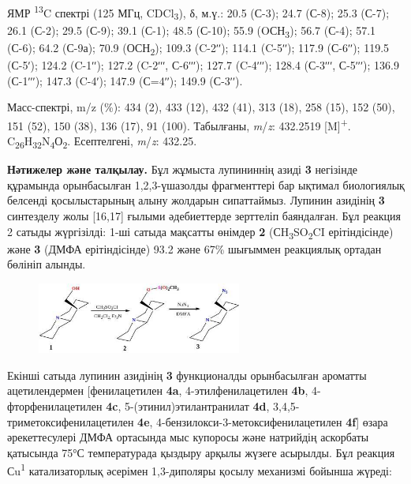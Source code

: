 \begin{multicols}{2}
ЯМР \textsuperscript{13}C спектрі (125 МГц, CDCl\textsubscript{3}), δ,
м.ү.: 20.5 (С-3); 24.7 (С-8); 25.3 (С-7); 26.1 (С-2); 29.5 (С-9); 39.1
(С-1); 48.5 (С-10); 55.9 (OСН\textsubscript{3}); 56.7 (С-4); 57.1 (С-6);
64.2 (С-9а); 70.9 (ОСН\textsubscript{2}); 109.3 (C-2ʹʹ); 114.1 (C-5ʹʹ);
117.9 (С-6ʹʹ); 119.5 (С-5ʹ); 124.2 (C-1ʹʹ); 127.2 (C-2ʹʹʹ, С-6ʹʹʹ);
127.7 (C-4ʹʹʹ); 128.4 (С-3ʹʹʹ, С-5ʹʹʹ); 136.9 (С-1ʹʹʹ); 147.3 (C-4ʹ);
147.9 (С=4ʹʹ); 149.9 (С-3ʹʹ).

Масс-спектрі, m/z (\%): 434 (2), 433 (12), 432 (41), 313 (18), 258 (15),
152 (50), 151 (52), 150 (38), 136 (17), 91 (100). Табылғаны,
\emph{m}/\emph{z}: 432.2519 {[}M{]}\textsuperscript{+}.
C\textsubscript{26}H\textsubscript{32}N\textsubscript{4}О\textsubscript{2}.
Есептелгені, \emph{m}/\emph{z}: 432.25.

{\bfseries Нәтижелер және талқылау.} Бұл жұмыста лупининнің азиді
{\bfseries 3} негізінде құрамында орынбасылған 1,2,3-үшазолды фрагменттері
бар ықтимал биологиялық белсенді қосылыстарының алыну жолдарын
сипаттаймыз. Лупинин азидінің {\bfseries 3} синтезделу жолы {[}16,17{]}
ғылыми әдебиеттерде зерттеліп баяндалған. Бұл реакция 2 сатыды
жүргізілді: 1-ші сатыда мақсатты өнімдер {\bfseries 2}
(СH\textsubscript{3}SO\textsubscript{2}CI ерітіндісінде) және {\bfseries 3}
(ДМФА ерітіндісінде) 93.2 және 67\% шығыммен реакциялық ортадан бөлініп
алынды.
\end{multicols}

\begin{figure}[H]
	\centering
	\includegraphics[width=0.6\textwidth]{assets/1011}
	\caption*{}
\end{figure}

\begin{multicols}{2}
Екінші сатыда лупинин азидінің {\bfseries 3} функционалды орынбасылған
ароматты ацетилендермен {[}фенилацетилен {\bfseries 4a},
4-этилфенилацетилен {\bfseries 4b}, 4-фторфенилацетилен {\bfseries 4c},
5-(этинил)этилантранилат {\bfseries 4d}, 3,4,5-триметоксифенилацетилен
{\bfseries 4e}, 4-бензилокси-3-метоксифенилацетилен {\bfseries 4f}{]} өзара
әрекеттесулері ДМФА ортасында мыс купоросы және натрийдің аскорбаты
қатысында 75°С температурада қыздыру арқылы жүзеге асырылды. Бұл реакция
Сu\textsuperscript{1} катализаторлық әсерімен 1,3-диполяры қосылу
механизмі бойынша жүреді:
\end{multicols}

